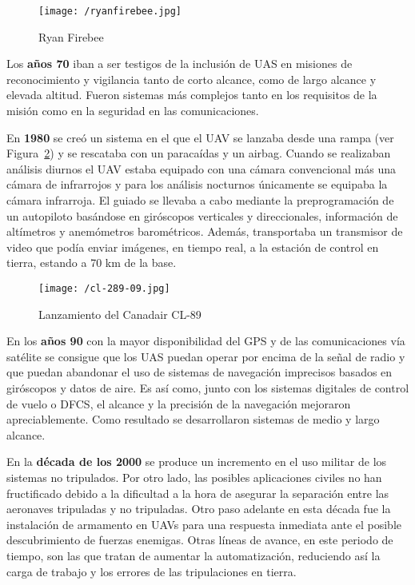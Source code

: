 \begin{figure}[!h]
\begin{center}
\texttt{[image: /ryanfirebee.jpg]}
\caption[Ryan Firebee]{Ryan Firebee}
\label{fig:ryanfirebee}
\end{center}
\end{figure}

\clearpage

Los \textbf{años 70} iban a ser testigos de la inclusión de \acs{UAS} en misiones de 
reconocimiento y vigilancia tanto de corto alcance, como de largo alcance y elevada altitud. Fueron sistemas 
más complejos tanto en los requisitos de la misión como en la seguridad en las comunicaciones.

En \textbf{1980} se creó un sistema en el que el \acs{UAV} se lanzaba desde una rampa (ver Figura~\ref{fig:cl89}) y se rescataba con un paracaídas y un airbag. 
Cuando se realizaban análisis diurnos el \acs{UAV} estaba equipado con una cámara convencional más una cámara de infrarrojos y para los análisis nocturnos únicamente se equipaba la cámara infrarroja. El guiado se llevaba a cabo mediante la preprogramación de un autopiloto basándose en giróscopos verticales y direccionales, información de altímetros y anemómetros barométricos. 
Además, transportaba un transmisor de video que podía enviar imágenes, en tiempo real, a la estación de control 
en tierra, estando a 70 km de la base.

\begin{figure}[!h]
\begin{center}
\texttt{[image: /cl-289-09.jpg]}
\caption[Lanzamiento del Canadair CL-89]{Lanzamiento del Canadair CL-89}
\label{fig:cl89}
\end{center}
\end{figure}

En los \textbf{años 90} con la mayor disponibilidad del \acs{GPS} y de las comunicaciones vía satélite se consigue que los \acs{UAS} puedan operar por encima de la señal de radio y que puedan abandonar el uso de sistemas de navegación imprecisos basados en giróscopos y
datos de aire. Es así como, junto con los sistemas digitales de control de vuelo o \acs{DFCS}, el alcance y la precisión de la navegación mejoraron apreciablemente. 
Como resultado se desarrollaron sistemas de medio y largo alcance. 

En la \textbf{década de los 2000} se produce un incremento en el uso militar de los sistemas no tripulados. 
Por otro lado, las posibles aplicaciones civiles no han fructificado debido a la dificultad a la hora de asegurar la 
separación entre las aeronaves tripuladas y no tripuladas.
Otro paso adelante en esta década fue la instalación de armamento en \acs{UAV}s para una respuesta inmediata ante el posible 
descubrimiento de fuerzas enemigas.
Otras líneas de avance, en este periodo de tiempo, son las que tratan de aumentar la automatización, reduciendo así
la carga de trabajo y los errores de las tripulaciones en tierra.

